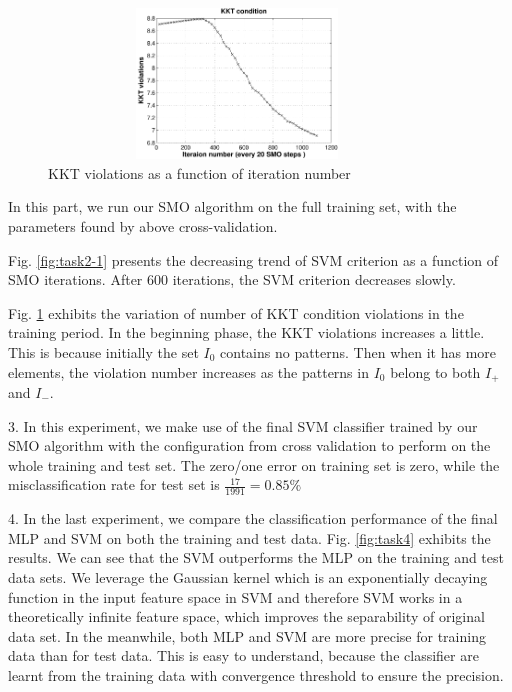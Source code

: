 \begin{figure}[htbp]
   \centering	
      \includegraphics[width=10cm, height=4cm]{figs/task2-2.pdf} 	
   \vspace{-0.3cm}
   \caption{KKT violations as a function of iteration number}\label{fig:task2-2}
\end{figure}


In this part, we run our SMO algorithm on the full training set, with the parameters found by above cross-validation. 


Fig. \ref{fig:task2-1} presents the decreasing trend of SVM criterion as a function of SMO iterations. After 600 iterations, the SVM criterion decreases slowly.

Fig. \ref{fig:task2-2} exhibits the variation of number of KKT condition violations in the training period. In the beginning phase, the KKT violations increases a little. This is because initially the set $I_0$ contains no patterns. Then when it has more elements, the violation number increases as the patterns in $I_0$ belong to both $I_{+}$ and $I_{-}$. 


3. In this experiment, we make use of the final SVM classifier trained by our SMO algorithm with the configuration from cross validation to perform on the whole training and test set. The zero/one error on training set is zero, while the misclassification rate for test set is $\frac{17}{1991}= 0.85\%$ 

4. In the last experiment, we compare the classification performance of the final MLP and SVM on both the training and test data. Fig. \ref{fig:task4} exhibits the results. We can see that the SVM outperforms the MLP on the training and test data sets. We leverage the Gaussian kernel which is an exponentially decaying function in the input feature space in SVM and therefore SVM works in a theoretically infinite feature space, which improves the separability of original data set. In the meanwhile, both MLP and SVM are more precise for training data than for test data. This is easy to understand, because the classifier are learnt from the training data with convergence threshold to ensure the precision. 


